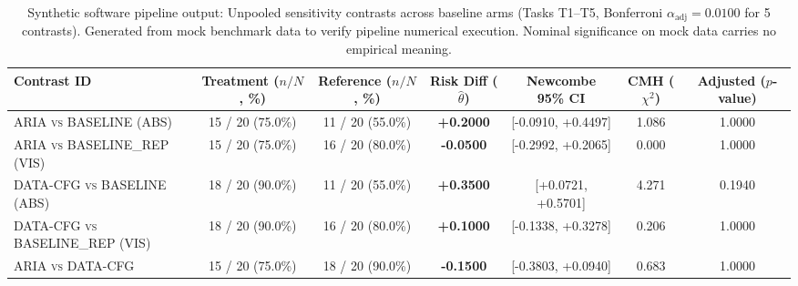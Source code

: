 \documentclass[conference]{IEEEtran}
\begin{document}
\begin{table}[ht]
\centering
\small
\caption{Synthetic software pipeline output: Unpooled sensitivity contrasts across baseline arms (Tasks T1--T5, Bonferroni $\alpha_{\mathrm{adj}} = 0.0100$ for 5 contrasts). Generated from mock benchmark data to verify pipeline numerical execution. Nominal significance on mock data carries no empirical meaning.}
\label{tab:synth1}
\begin{tabular*}{\textwidth}{@{\extracolsep{\fill}}lcccccc@{}}
\toprule
\textbf{Contrast ID} & \shortstack{\textbf{Treatment} \\ \scriptsize($n/N$, \%)} & \shortstack{\textbf{Reference} \\ \scriptsize($n/N$, \%)} & \shortstack{\textbf{Risk Diff} \\ \scriptsize($\hat{\theta}$)} & \textbf{Newcombe 95\% CI} & \shortstack{\textbf{CMH} \\ \scriptsize($\chi^2$)} & \shortstack{\textbf{Adjusted} \\ \scriptsize($p$-value)} \\
\midrule
\textsc{ARIA vs BASELINE (ABS)}          & 15 / 20 (75.0\%) & 11 / 20 (55.0\%) & \textbf{+0.2000} & [-0.0910, +0.4497] & 1.086 & 1.0000 \\
\textsc{ARIA vs BASELINE\_REP (VIS)}      & 15 / 20 (75.0\%) & 16 / 20 (80.0\%) & \textbf{-0.0500} & [-0.2992, +0.2065] & 0.000 & 1.0000 \\
\textsc{DATA-CFG vs BASELINE (ABS)}      & 18 / 20 (90.0\%) & 11 / 20 (55.0\%) & \textbf{+0.3500} & [+0.0721, +0.5701] & 4.271 & 0.1940 \\
\textsc{DATA-CFG vs BASELINE\_REP (VIS)}  & 18 / 20 (90.0\%) & 16 / 20 (80.0\%) & \textbf{+0.1000} & [-0.1338, +0.3278] & 0.206 & 1.0000 \\
\textsc{ARIA vs DATA-CFG}               & 15 / 20 (75.0\%) & 18 / 20 (90.0\%) & \textbf{-0.1500} & [-0.3803, +0.0940] & 0.683 & 1.0000 \\
\bottomrule
\end{tabular*}
\end{table}
\end{document}
